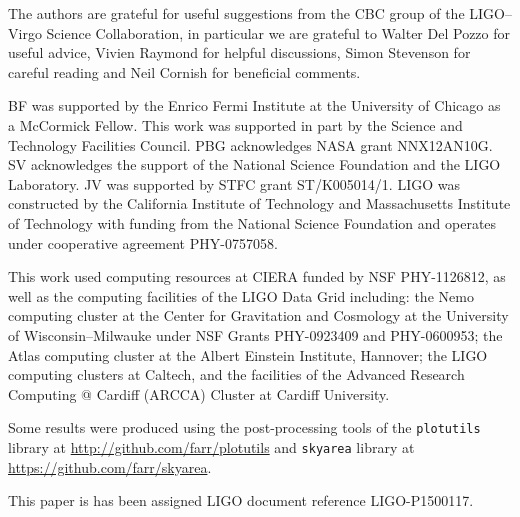 \acknowledgements

The authors are grateful for useful suggestions from the CBC group of the LIGO--Virgo Science Collaboration, in particular we are grateful to Walter Del Pozzo for useful advice, Vivien Raymond for helpful discussions, Simon Stevenson for careful reading and Neil Cornish for beneficial comments.

BF was supported by the Enrico Fermi Institute at the University of Chicago as a McCormick Fellow.  This work was supported in part by the Science and Technology Facilities Council. PBG acknowledges NASA grant NNX12AN10G. SV acknowledges the support of the National Science Foundation and the LIGO Laboratory. JV was supported by STFC grant ST/K005014/1. LIGO was constructed by the California Institute of Technology and Massachusetts Institute of Technology with funding from the National Science Foundation and operates under cooperative agreement PHY-0757058.

This work used computing resources at CIERA funded by NSF PHY-1126812, as well as the computing facilities of the LIGO Data Grid including: the Nemo computing cluster at the Center for Gravitation and Cosmology at the University of Wisconsin--Milwauke under NSF Grants PHY-0923409 and PHY-0600953; the Atlas computing cluster at the Albert Einstein Institute, Hannover; the LIGO computing clusters at Caltech, and the facilities of the Advanced Research Computing @ Cardiff (ARCCA) Cluster at Cardiff University.

Some results were produced using the post-processing tools of the \texttt{plotutils} library at \url{http://github.com/farr/plotutils} and \texttt{skyarea} library at \url{https://github.com/farr/skyarea}.

This paper is has been assigned LIGO document reference LIGO-P1500117.
  
  
  
  
  
  
  